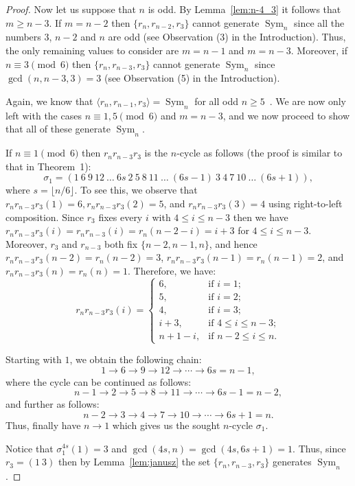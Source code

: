 \documentclass[
final
]{dmtcs-episciences}
\DeclareMathOperator{\Sym}{\mathrm{Sym}}
\begin{document}
\begin{proof}
\smallskip

Now let us suppose that $n$ is odd. By Lemma~\ref{lem:n-4_3} it follows that $m\geqslant n-3$. If $m=n-2$ then $\{r_n, r_{n-2}, r_3\}$ cannot generate $\Sym_n$ since all the numbers $3$, $n-2$ and $n$ are odd (see Observation (3) in the Introduction). Thus, the only remaining values to consider are $m=n-1$ and $m=n-3$. Moreover, if $n\equiv 3\pmod 6$ then $\{r_n,r_{n-3},r_3\}$ cannot generate $\Sym_n$ since $\gcd(n,n-3,3)=3$ (see Observation (5) in the Introduction). 

Again, we know that $\langle r_n,r_{n-1},r_3\rangle=\Sym_n$ for all odd $n\geqslant 5$~\cite{BS03}. We are now only left with the cases $n\equiv 1,5\pmod 6$ and $m=n-3$, and we now proceed to show that all of these generate $\Sym_n$.

If $n\equiv 1\pmod 6$ then $r_nr_{n-3}r_{3}$ is the $n$-cycle as follows (the proof is similar to that in Theorem~1):
    \[
    \sigma_1=(1\ 6\ 9\ 12 \ \ldots \ 6s\ 2\ 5\ 8 \ 11 \ \ldots \ (6s-1)\ 3\ 4\ 7\ 10\ \ldots\ (6s+1)),
    \] where $s=\lfloor n/6\rfloor$. To see this, we observe that $r_nr_{n-3}r_3(1)=6, r_nr_{n-3}r_3(2)=5$, and $r_nr_{n-3}r_3(3)=4$ using right-to-left composition. Since $r_3$ fixes every $i$ with $4\leqslant i\leqslant n-3$ then we have $r_nr_{n-3}r_3(i) = r_nr_{n-3}(i)=r_n(n-2-i)=i+3$ for $4\leqslant i\leqslant n-3$. Moreover, $r_3$ and $r_{n-3}$ both fix $\{n-2,n-1,n\}$, and hence $r_nr_{n-3}r_3(n-2)=r_n(n-2)=3$, $r_nr_{n-3}r_3(n-1)=r_n(n-1)=2$, and $r_nr_{n-3}r_3(n)=r_n(n)=1$. Therefore, we have:
\[
r_nr_{n-3}r_3(i)=
\begin{cases}
6, & \text{if }i=1;\\
5, & \text{if }i=2;\\
4, & \text{if }i=3;\\
i+3, & \text{if }4\leqslant i\leqslant n-3;\\
n+1-i, & \text{if }n-2\leqslant i\leqslant n.
\end{cases}
\]

Starting with $1$, we obtain the following chain: \[1\rightarrow6\rightarrow9\rightarrow12
\rightarrow\cdots\rightarrow6s=n-1,\] where the cycle can be continued as follows: \[n-1\rightarrow2\rightarrow5\rightarrow8
\rightarrow11\rightarrow\cdots
\rightarrow6s-1=n-2,\] and further as follows:
\[n-2\rightarrow3\rightarrow4\rightarrow7
\rightarrow10\rightarrow\cdots
\rightarrow6s+1=n.\]
Thus, finally have $n\rightarrow 1$ which gives us the sought $n$-cycle $\sigma_1$.

Notice that $\sigma_1^{4s}(1)=3$ and $\gcd(4s,n)=\gcd(4s,6s+1)=1$. Thus,  since $r_3=(1\ 3)$ then by Lemma~\ref{lem:janusz} the set $\{r_n,r_{n-3},r_3\}$ generates $\Sym_n$.


\end{proof}
\end{document}
